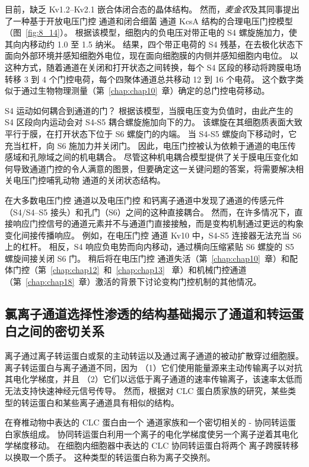 目前，缺乏 Kv1.2–Kv2.1 嵌合体闭合态的晶体结构。 然而，\textit{麦金农}及其同事提出了一种基于开放电压门控  通道和闭合细菌  通道 KcsA 结构的合理电压门控模型（图~\ref{fig:8_14}）。
根据该模型，细胞内的负电压对带正电的 S4 螺旋施加力，使其向内移动约 1.0 至 1.5 纳米。
结果，四个带正电荷的 S4 残基，在去极化状态下面向外部环境并感知细胞外电位，现在面向细胞膜的内侧并感知细胞内电位。
以这种方式，随着通道在关闭和打开状态之间转换，每个 S4 区段的移动将跨膜电场转移 3 到 4 个门控电荷，每个四聚体通道总共移动 12 到 16 个电荷。 
这个数字类似于通过生物物理测量（第~\ref{chap:chap10}~章）确定的总门控电荷移动。


S4 运动如何耦合到通道的门？
根据该模型，当膜电压变为负值时，由此产生的 S4 区段向内运动会对 S4-S5 耦合螺旋施加向下的力。
该螺旋在其细胞质表面大致平行于膜，在打开状态下位于 S6 螺旋门的内端。
当 S4-S5 螺旋向下移动时，它充当杠杆，向 S6 施加力并关闭门。
因此，电压门控被认为依赖于通道的电压传感域和孔隙域之间的机电耦合。
尽管这种机电耦合模型提供了关于膜电压变化如何导致通道门控的令人满意的图景，但要确定这一关键问题的答案，将需要解决相关电压门控哺乳动物  通道的关闭状态结构。


在大多数电压门控  通道以及电压门控  和钙离子通道中发现了通道的传感元件（S4/S4–S5 接头）和孔门（S6）之间的这种直接耦合。
然而，在许多情况下，直接响应门控信号的通道元素并不与通道门直接接触，而是变构机制通过更远的构象变化间接传播响应。
例如，在电压门控  通道 Kv10 中，S4-S5 连接器无法充当 S6 上的杠杆。
相反，S4 响应负电势而向内移动，通过横向压缩紧贴 S6 螺旋的 S5 螺旋间接关闭 S6 门。
稍后将在电压门控  通道失活（第~\ref{chap:chap10}~章）和配体门控（第~\ref{chap:chap12}~和~\ref{chap:chap13}~ 章）和机械门控通道（第~\ref{chap:chap18}~章）激活的背景下讨论变构门控机制的其他情况。



\subsection{氯离子通道选择性渗透的结构基础揭示了通道和转运蛋白之间的密切关系}

离子通过离子转运蛋白或泵的主动转运以及通过离子通道的被动扩散穿过细胞膜。
离子转运蛋白与离子通道不同，因为
（1）它们使用能量源来主动传输离子以对抗其电化学梯度，并且
（2）它们以远低于离子通道的速率传输离子，该速率太低而无法支持快速神经元信号传导。
然而，根据对 CLC 蛋白质家族的研究，某些类型的转运蛋白和某些离子通道具有相似的结构。


在脊椎动物中表达的 CLC 蛋白由一个  通道家族和一个密切相关的 - 协同转运蛋白家族组成。
协同转运蛋白利用一个离子的电化学梯度使另一个离子逆着其电化学梯度移动。
在细胞内细胞器中表达的 CLC  协同转运蛋白将两个  离子跨膜转移以换取一个质子。
这种类型的转运蛋白称为离子交换剂。


